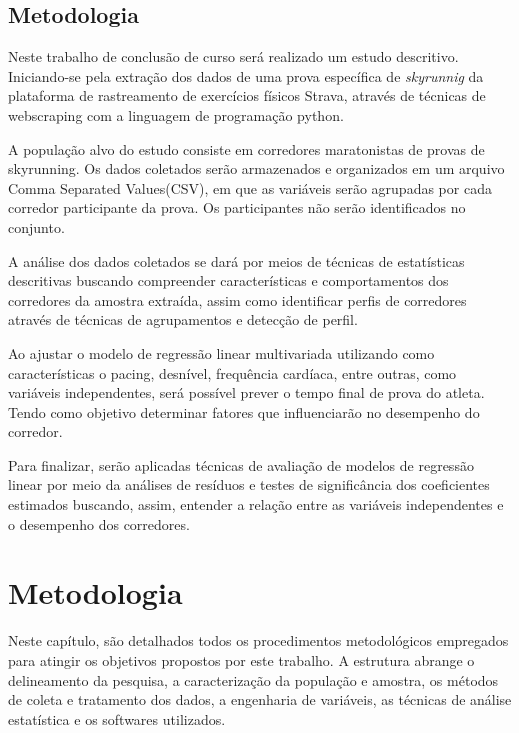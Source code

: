 \section{Metodologia}

 Neste trabalho de conclusão de curso será realizado um estudo descritivo. Iniciando-se pela extração dos dados de uma prova específica de \textit{skyrunnig} da plataforma de rastreamento de exercícios físicos Strava, através de técnicas de webscraping com a linguagem de programação python. 
 
 A população alvo do estudo consiste em corredores maratonistas de provas de skyrunning. Os dados coletados serão armazenados e organizados em um arquivo Comma Separated Values(CSV), em que as variáveis serão agrupadas por cada corredor participante da prova. Os participantes não serão identificados no conjunto. 

 A análise dos dados coletados se dará por meios de técnicas de estatísticas descritivas buscando compreender características e comportamentos dos corredores da amostra extraída, assim como identificar perfis de corredores através de técnicas de agrupamentos e detecção de perfil. 
 
 Ao ajustar o modelo de regressão linear multivariada utilizando como características o pacing, desnível, frequência cardíaca, entre outras, como variáveis independentes, será possível prever o tempo final de prova do atleta. Tendo como objetivo determinar fatores que influenciarão no desempenho do corredor.

 Para finalizar, serão aplicadas técnicas de avaliação de modelos de regressão linear por meio da análises de resíduos e testes de significância dos coeficientes estimados buscando, assim, entender a relação entre as variáveis independentes e o desempenho dos corredores.



\chapter{Metodologia}
\label{chap:metodologia}

Neste capítulo, são detalhados todos os procedimentos metodológicos empregados para atingir os objetivos propostos por este trabalho. A estrutura abrange o delineamento da pesquisa, a caracterização da população e amostra, os métodos de coleta e tratamento dos dados, a engenharia de variáveis, as técnicas de análise estatística e os softwares utilizados.

